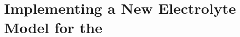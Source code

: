 
\clearpage
\chapter{Implementing a New Electrolyte Model for the }\label{ch:newelectrolytemodel}
\startcontents[chapters]

\graphicspath{{6/figures/}}

\bigskip

% 

% 

% 

% 

% 

% 

